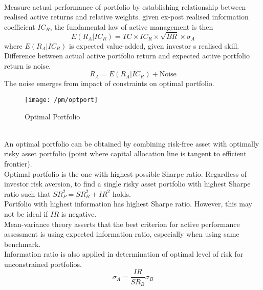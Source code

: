 \begin{remark} \\
Measure actual performance of portfolio by establishing relationship between realised active returns and relative weights. given ex-post realised information coefficient $IC_R$, the fundamental law of active management is then
\begin{equation}
E(R_A \vert IC_R) = TC \times IC_R \times \sqrt{BR} \times \sigma_A \nonumber
\end{equation}
where $E(R_A \vert IC_R)$ is expected value-added, given investor
s realised skill.\\
Difference between actual active portfolio return and expected active portfolio return is noise.
\begin{equation}
R_A = E(R_A \vert IC_R) + \text{Noise} \nonumber
\end{equation}
The noise emerges from impact of constraints on optimal portfolio.
\end{remark}

\begin{figure}[H]
\centering
\texttt{[image: /pm/optport]}
\caption{Optimal Portfolio}
\end{figure}

\begin{remark} \\
An optimal portfolio can be obtained by combining risk-free asset with optimally risky asset portfolio (point where capital allocation line is tangent to efficient frontier).\\
Optimal portfolio is the one with highest possible Sharpe ratio. Regardless of investor risk aversion, to find a single risky asset portfolio with highest Sharpe ratio such that $SR_P^2 = SR_B^2 + IR^2$ holds.\\
Portfolio with highest information has highest Sharpe ratio. However, this may not be ideal if $IR$ is negative.\\
Mean-variance theory asserts that the best criterion for active performance assessment is using expected information ratio, especially when using same benchmark.\\
Information ratio is also applied in determination of optimal level of risk for unconstrained portfolios.
\begin{equation}
\sigma_A = \frac{IR}{SR_B} \sigma_B \nonumber
\end{equation}
\end{remark}

